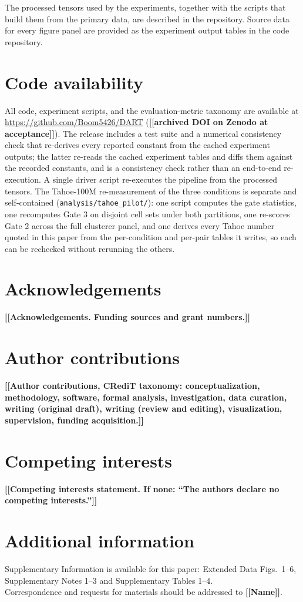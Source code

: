 \documentclass[11pt,letterpaper]{article}
\newcommand{\TODO}[1]{{\color{BrickRed}\textbf{[[#1]]}}}
\begin{document}
The processed tensors used by the experiments, together with the scripts that build them from the
primary data, are described in the repository. Source data for every figure panel are provided as
the experiment output tables in the code repository.

\section*{Code availability}

All code, experiment scripts, and the evaluation-metric taxonomy are available at
\url{https://github.com/Boom5426/DART} (\TODO{archived DOI on Zenodo at acceptance}). The
release includes a test suite and a numerical consistency check that re-derives every
reported constant from the cached experiment outputs; the latter re-reads the cached
experiment tables and diffs them against the recorded constants, and is a consistency check
rather than an end-to-end re-execution. A single driver script re-executes the pipeline from the
processed tensors. The Tahoe-100M re-measurement of the three conditions is separate and
self-contained (\texttt{analysis/tahoe\_pilot/}): one script computes the gate statistics, one
recomputes Gate 3 on disjoint cell sets under both partitions, one re-scores Gate 2 across the
full clusterer panel, and one derives every Tahoe number quoted in this paper from the per-condition
and per-pair tables it writes, so each can be rechecked without rerunning the others.

\section*{Acknowledgements}
\TODO{Acknowledgements. Funding sources and grant numbers.}

\section*{Author contributions}
\TODO{Author contributions, CRediT taxonomy: conceptualization, methodology, software,
formal analysis, investigation, data curation, writing (original draft), writing (review and
editing), visualization, supervision, funding acquisition.}

\section*{Competing interests}
\TODO{Competing interests statement. If none: ``The authors declare no competing interests.''}

\section*{Additional information}
\noindent Supplementary Information is available for this paper: Extended Data Figs.\
1--6, Supplementary Notes 1--3 and Supplementary Tables 1--4.\\
Correspondence and requests for materials should be addressed to \TODO{Name}.



\end{document}
